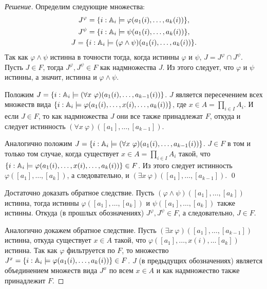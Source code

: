     \begin{proof}[Решение]
        Определим следующие множества:
        \begin{gather*}
            J^{\varphi} = \{i : \mathbb{A}_i \models \varphi(a_1(i), \ldots, a_k(i))\}, \\
            J^{\psi} = \{i : \mathbb{A}_i \models \psi(a_1(i), \ldots, a_k(i))\}, \\
            J = \{i : \mathbb{A}_i \models (\varphi \land \psi)(a_1(i), \ldots, a_k(i))\}.
        \end{gather*}
        Так как \(\varphi \land \psi\) истинна в точности тогда, когда истинны \(\varphi\) и \(\psi\), \(J = J^{\varphi} \cap J^{\psi}\). Пусть \(J \in F\), тогда \(J^{\varphi}, J^{\psi} \in F\) как надмножества \(J\). Из этого следует, что \(\varphi\) и \(\psi\) истинны, а значит, истинна и \(\varphi \land \psi\).

        Положим \(J = \{i : \mathbb{A}_i \models (\forall x \ \varphi)(a_1(i), \ldots, a_{k-1}(i))\}\). \(J\) является пересечением всех множеств вида \(\{i : \mathbb{A}_i \models \varphi(a_1(i), \ldots, x(i), \ldots, a_k(i))\}\), где \(x \in A = \prod_{i \in I} A_i\). И если \(J \in F\), то как надмножества \(J\) они все также принадлежат \(F\), откуда и следует истинность \((\forall x \ \varphi)([a_1], \ldots, [a_{k-1}])\).

        Аналогично положим \(J = \{i : \mathbb{A}_i \models (\forall x \ \varphi)(a_1(i), \ldots, a_{k-1}(i))\}\). \(J \in F\) в том и только том случае, когда существует \(x \in A = \prod_{i \in I} A_i\) такой, что \(\{i : \mathbb{A}_i \models \varphi(a_1(i), \ldots, x(i), \ldots, a_k(i))\} \in F\). Из этого следует истинность \(\varphi([a_1], \ldots, [a_k])\), а следовательно, и \((\exists x \ \varphi)([a_1], \ldots, [a_{k-1}])\). \qed

        Достаточно доказать обратное следствие. Пусть \((\varphi \land \psi)([a_1], \ldots, [a_k])\) истинна, тогда истинны \(\varphi([a_1], \ldots, [a_k])\) и \(\psi([a_1], \ldots, [a_k])\) также истинны. Откуда (в прошлых обозначениях) \(J^{\varphi}, J^{\psi} \in F\), а следовательно, \(J \in F\).

        Аналогично докажем обратное следствие. Пусть \((\exists x \ \varphi)([a_1], \ldots, [a_{k-1}])\) истинна, откуда существует \(x \in A\) такой, что \(\varphi([a_1], \ldots, x(i), \ldots [a_k])\) истинна. Так как \(\varphi\) фильтруется по \(F\), то множество~\(J^x = \{i : \mathbb{A}_i \models \varphi(a_1(i), \ldots, a_k(i))\} \in F\). \(J\) (в предыдущих обозначениях) является объединением множеств вида \(J^x\) по всем \(x \in A\) и как надмножество также принадлежит \(F\).
    \end{proof}

